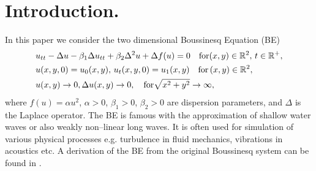 \documentclass[11pt,a4paper,twoside]{article}
\begin{document}

\section{Introduction.}\label{introduction}

In this paper we  consider the two dimensional Boussinesq  Equation (BE)
\begin{align} \label{eq1}
&u_{tt} - \Delta u -\beta_1  \Delta u_{tt} +\beta_2 \Delta ^2 u + \Delta f(u)=0   \quad \text{for}  (x,y) \in \mathbb{R}^2, \, t\in\mathbb{R}^+, 
\\ \nonumber &u(x,y,0)=u_0(x,y), \, u_t(x,y,0)=u_1(x,y)   \quad\text{for} \, (x,y) \in \mathbb{R}^2,
\\  &u(x,y) \rightarrow 0,  \Delta u(x,y) \rightarrow 0 ,  \quad \text{for}  \sqrt{x^2 + y^2} \rightarrow \infty, \label{eq11}
\end{align}
where   $f(u)=\alpha u^2$,  $\alpha>0$, $\beta_1>0$, $\beta_2>0$  are dispersion parameters, and $\Delta$ is the Laplace operator. The BE is famous with the approximation of shallow water waves or also weakly non--linear long waves. It is often used for simulation of various physical processes e.g. turbulence in fluid mechanics, vibrations in acoustics etc. A derivation of the BE from the original Boussinesq system can be found in \cite{ChChr}.
\end{document}
